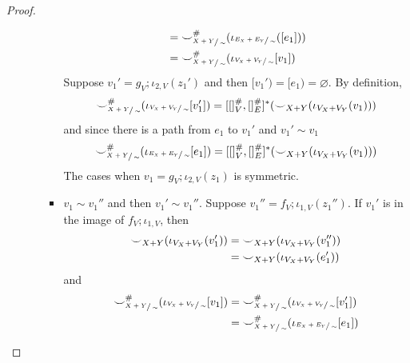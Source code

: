 \begin{proof}
\begin{itemize}
\begin{itemize}
\begin{itemize}
\begin{align*}
                                                                                                                     &= {\smile}_{\sfrac{X+Y}{\sim}}^{{\#}}(\iota_{\sfrac{E_{X} + E_{Y}}{\sim}}([e_1]))\\
                                                                                                                     &= {\smile}_{\sfrac{X+Y}{\sim}}^{{\#}}(\iota_{\sfrac{V_{X} + V_{Y}}{\sim}}[v_1])
                            \end{align*}
                            Suppose $v_1' = g_{V};\iota_{2,V}(z_1')$ and then $[v_1') = [e_1) = \varnothing$.
                            By definition,
                            \[
                                {\smile}_{\sfrac{X+Y}{\sim}}^{{\#}}(\iota_{\sfrac{V_{X} + V_{Y}}{\sim}}[v_1']) = [[]_{V}^{{\#}},[]_{E}^{{\#}}]^{*}({\smile}_{X+Y}(\iota_{V_{X} + V_{Y}}(v_1)))
                            \]
                            and since there is a path from $e_1$ to $v_1'$ and $v_1' \sim v_1$
                            \[
                                {\smile}_{\sfrac{X+Y}{\sim}}^{{\#}}(\iota_{\sfrac{E_{X} + E_{Y}}{\sim}}[e_1]) = [[]_{V}^{{\#}},[]_{E}^{{\#}}]^{*}({\smile}_{X+Y}(\iota_{V_{X} + V_{Y}}(v_1)))
                            \]
                            The cases when $v_1 = g_{V};\iota_{2,V}(z_1)$ is symmetric.
                        \item $v_1 \sim v_1''$ and then $v_1' \sim v_1''$. Suppose $v_1'' = f_{V};\iota_{1,V}(z_1'')$.
                              If $v_1'$ is in the image of $f_{V};\iota_{1,V}$, then
                              \begin{align*}
                                {\smile}_{X+Y}(\iota_{V_{X} + V_{Y}}(v_1')) &= {\smile}_{X+Y}(\iota_{V_{X} + V_{Y}}(v_1''))\\ 
                                                                               &= {\smile}_{X+Y}(\iota_{V_{X} + V_{Y}}(e_1'))
                              \end{align*}
                              and
                              \begin{align*}
                                \consistency_{\sfrac{X+Y}{\sim}}^{\hashtag}(\iota_{\sfrac{V_{X} + V_{Y}}{\sim}}[v_1]) &=
                                \consistency_{\sfrac{X+Y}{\sim}}^{\hashtag}(\iota_{\sfrac{V_{X} + V_{Y}}{\sim}}[v_1'])\\ &= \consistency_{\sfrac{X+Y}{\sim}}^{\hashtag}(\iota_{\sfrac{E_{X} + E_{Y}}{\sim}}[e_1])

\end{align*}
\end{itemize}
\end{itemize}
\end{itemize}
\end{proof}
